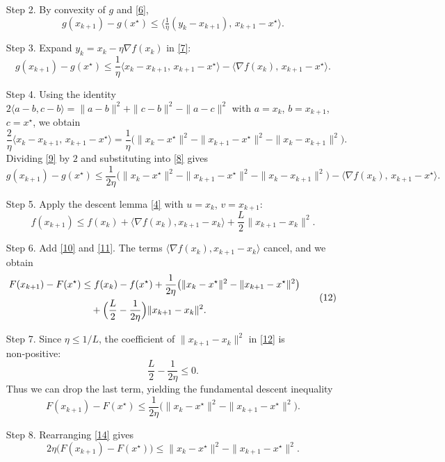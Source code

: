 \documentclass{article}
\newcommand{\grad}{\nabla}
\begin{document}
\begin{enumerate}
\begin{enumerate}
\item[Step 2.] By convexity of $g$ and \eqref{6},
\[
g(x_{k+1})-g(x^{\star})\le \big\langle \tfrac{1}{\eta}(y_{k}-x_{k+1}),\,x_{k+1}-x^{\star}\big\rangle .
\tag{7}
\]

\item[Step 3.] Expand $y_{k}=x_{k}-\eta\grad f(x_{k})$ in \eqref{7}:
\[
g(x_{k+1})-g(x^{\star})\le
\frac{1}{\eta}\langle x_{k}-x_{k+1},\,x_{k+1}-x^{\star}\rangle
-\langle\grad f(x_{k}),\,x_{k+1}-x^{\star}\rangle .
\tag{8}
\]

\item[Step 4.] Using the identity $2\langle a-b,c-b\rangle =\|a-b\|^{2}+\|c-b\|^{2}-\|a-c\|^{2}$ with $a=x_{k}$, $b=x_{k+1}$, $c=x^{\star}$, we obtain
\[
\frac{2}{\eta}\langle x_{k}-x_{k+1},\,x_{k+1}-x^{\star}\rangle
= \frac{1}{\eta}\bigl(\|x_{k}-x^{\star}\|^{2}-\|x_{k+1}-x^{\star}\|^{2}-\|x_{k}-x_{k+1}\|^{2}\bigr).
\tag{9}
\]
Dividing \eqref{9} by $2$ and substituting into \eqref{8} gives
\[
g(x_{k+1})-g(x^{\star})\le
\frac{1}{2\eta}\bigl(\|x_{k}-x^{\star}\|^{2}-\|x_{k+1}-x^{\star}\|^{2}-\|x_{k}-x_{k+1}\|^{2}\bigr)
-\langle\grad f(x_{k}),\,x_{k+1}-x^{\star}\rangle .
\tag{10}
\]

\item[Step 5.] Apply the descent lemma \eqref{4} with $u=x_{k}$, $v=x_{k+1}$:
\[
f(x_{k+1})\le f(x_{k})+\langle\grad f(x_{k}),x_{k+1}-x_{k}\rangle
+\frac{L}{2}\|x_{k+1}-x_{k}\|^{2}.
\tag{11}
\]

\item[Step 6.] Add \eqref{10} and \eqref{11}. The terms $\langle\grad f(x_{k}),x_{k+1}-x_{k}\rangle$ cancel, and we obtain
\[
\begin{aligned}
F(x_{k+1})-F(x^{\star}) 
&\le f(x_{k})-f(x^{\star})
+\frac{1}{2\eta}\bigl(\|x_{k}-x^{\star}\|^{2}-\|x_{k+1}-x^{\star}\|^{2}\bigr)  \\
&\quad +\Bigl(\frac{L}{2}-\frac{1}{2\eta}\Bigr)\|x_{k+1}-x_{k}\|^{2}.
\end{aligned}
\tag{12}
\]

\item[Step 7.] Since $\eta\le 1/L$, the coefficient of $\|x_{k+1}-x_{k}\|^{2}$ in \eqref{12} is non‑positive:
\[
\frac{L}{2}-\frac{1}{2\eta}\le 0.
\tag{13}
\]
Thus we can drop the last term, yielding the fundamental descent inequality
\[
F(x_{k+1})-F(x^{\star})\le
\frac{1}{2\eta}\bigl(\|x_{k}-x^{\star}\|^{2}-\|x_{k+1}-x^{\star}\|^{2}\bigr).
\tag{14}
\]

\item[Step 8.] Rearranging \eqref{14} gives
\[
2\eta\bigl(F(x_{k+1})-F(x^{\star})\bigr)
\le\|x_{k}-x^{\star}\|^{2}-\|x_{k+1}-x^{\star}\|^{2}.
\tag{15}
\]


\end{enumerate}
\end{enumerate}
\end{document}
